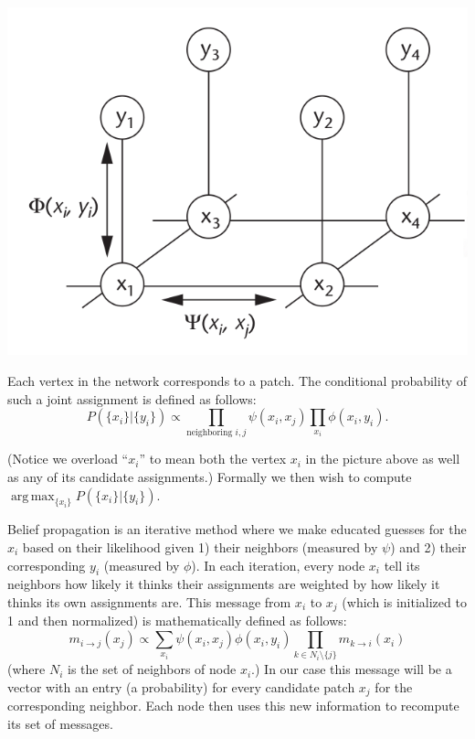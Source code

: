 \documentclass[a4paper]{article}
\DeclareMathOperator*{\argmax}{arg\,max}
\begin{document}
\begin{center}
\includegraphics[scale=.5]{figs/markov}
\label{markov}
\end{center}

Each vertex in the network corresponds to a patch. The conditional probability of such a joint assignment is defined as follows:
$$P(\{x_i\} | \{y_i\}) \propto \prod_{\text{neighboring } i, j} \psi(x_i, x_j) \prod_{x_i} \phi(x_i, y_i).$$

(Notice we overload “$x_i$” to mean both the vertex $x_i$ in the picture above as well as any of its candidate assignments.)
Formally we then wish to compute $\argmax_{\{x_i\}} P(\{x_i\} | \{y_i\})$.

Belief propagation is an iterative method where we make educated guesses for the $x_i$ based on their likelihood given 1) their neighbors (measured by $\psi$) and 2) their corresponding $y_i$ (measured by $\phi$). In each iteration, every node $x_i$ tell its neighbors how likely it thinks their assignments are weighted by how likely it thinks its own assignments are. This message from $x_i$ to $x_j$ (which is initialized to 1 and then normalized) is mathematically defined as follows:
$$m_{i \to j}(x_j) \propto \sum_{x_i} \psi(x_i, x_j) \phi(x_i, y_i) \prod_{k \in N_i \setminus \{j\}} m_{k \to i}(x_i)$$
(where $N_i$ is the set of neighbors of node $x_i$.) In our case this message will be a vector with an entry (a probability) for every candidate patch $x_j$ for the corresponding neighbor. Each node then uses this new information to recompute its set of messages.
\end{document}
